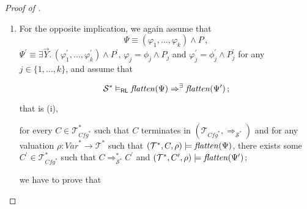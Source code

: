 \begin{proof}[Proof of ]
\begin{enumerate}
\begin{proofenv}
    \end{proofenv}
    Since we have constructed $C^\prime$ as a list of smaller configurations,
    it remains to be proven that
    \begin{proofenv}
        there exists a $\mathcal{T}$-valuation $\rho^\prime_0$
        satisfying $\rho^\prime_0(v) = \rho(v)$ for any $v \in \mathit{Var} \setminus \vec{Y}$
        such that for any $j \in \{ 1, \ldots, k \}$,
        $(\mathcal{T}, c^\prime_j, \rho^\prime_0) \modelsML \varphi^\prime_j \land P$.
    \end{proofenv}
    Let us choose $\rho^\prime_0$ defined by
    $\rho_0^\prime(v) = \rho_2(v)$ for any $v \in \mathit{Var}$.
    We verify that $\rho_0^\prime(v) = \rho_2(v) = \rho_1(v) = \rho_0(v) = \rho(v)$
    for any $v \in \mathit{Var} \setminus \vec{Y}$,
    and the rest follows from the assumption (iii) by .
    This concludes the proof of the first implication.
    \item For the opposite implication, 
    we again assume that
    \begin{equation*}
        \Psi \equiv (\varphi_1,\ldots,\varphi_k) \land P \, ,
    \end{equation*}
    $\Psi^\prime \equiv \exists \vec{Y}.\, (\varphi_1^\prime,\ldots,\varphi_k^\prime) \land P^\prime$,
    $\varphi_j = \phi_j \land P_j$ and $\varphi^\prime_j = \phi^\prime_j \land P^\prime_j$ for any $j \in \{ 1, \ldots, k \}$,
    and assume that
    \begin{proofenv}
        \begin{equation*}
            \mathcal{S}^* \vDash_{\mathsf{RL}} \mathit{flatten}(\Psi) \Rightarrow^\exists \mathit{flatten}(\Psi^\prime) \, ;
        \end{equation*}
    \end{proofenv}
    that is (i),
    \begin{proofenv}
        for every $C \in \mathcal{T}^*_{\mathit{Cfg}^*}$ such that $C$ terminates in
        $(\mathcal{T}_{\mathit{Cfg}^*}, \Rightarrow_{\mathcal{S}^*})$
        and for any valuation $\rho : \mathit{Var}^* \to \mathcal{T}^*$ such that
        $(\mathcal{T}^*, C, \rho) \models \mathit{flatten}(\Psi)$,
        there exists some $C^\prime \in \mathcal{T}^*_{\mathit{Cfg}^*}$ such that
        $C \Rightarrow_{\mathcal{S}^*}^* C^\prime$
        and $(\mathcal{T}^*, C^\prime, \rho) \models \mathit{flatten}(\Psi^\prime)$;
    \end{proofenv}
    we have to prove that
    \begin{proofenv}

\end{proofenv}
\end{enumerate}
\end{proof}
